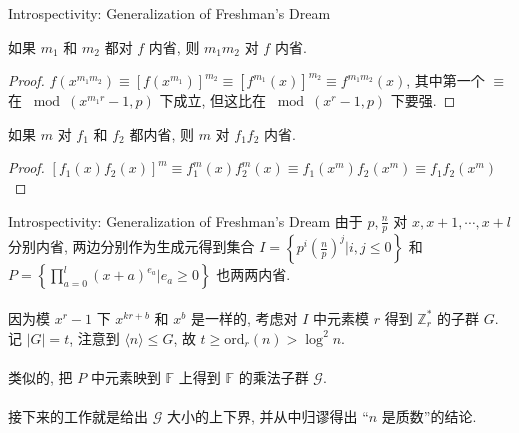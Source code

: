 \documentclass{beamer}
\def\le{\leqslant}
\def\ge{\geqslant}
\def\ord{\textrm{ord}}
\begin{document}
\begin{frame}{Introspectivity: Generalization of Freshman's Dream}
	
	\begin{lemma}[数乘封闭性]
		如果 $m_1$ 和 $m_2$ 都对 $f$ 内省, 则 $m_1m_2$ 对 $f$ 内省.
	\end{lemma}
	\begin{proof}
		$f(x^{m_1m_2}) \equiv [f(x^{m_1})]^{m_2} \equiv [f^{m_1}(x)]^{m_2} \equiv f^{m_1m_2}(x)$, 其中第一个 $\equiv$ 在 $\bmod (x^{m_1r} - 1, p)$ 下成立, 但这比在 $\bmod (x^{r} - 1, p)$ 下要强.
	\end{proof}
	\begin{lemma}[多项式乘封闭性]
		如果 $m$ 对 $f_1$ 和 $f_2$ 都内省, 则 $m$ 对 $f_1f_2$ 内省.
	\end{lemma}
	\begin{proof}
		$[f_1(x)f_2(x)]^m \equiv f_1^m(x)f_2^m(x) \equiv f_1(x^m)f_2(x^m) \equiv f_1f_2(x^m)$
	\end{proof}
\end{frame}
\begin{frame}{Introspectivity: Generalization of Freshman's Dream}
	由于 $p, \frac np$ 对 $x, x + 1, \cdots, x + l$ 分别内省, 两边分别作为生成元得到集合 $I = \left\{p^i \left(\frac np\right)^j \bigg| i, j \le 0\right\}$ 和 $P = \left\{\prod\limits_{a=0}^{l}(x + a)^{e_a} \bigg| e_a \ge 0\right\}$ 也两两内省. \\~\\

	因为模 $x^r - 1$ 下 $x^{kr + b}$ 和 $x^b$ 是一样的, 考虑对 $I$ 中元素模 $r$ 得到 $\mathbb Z_r^*$ 的子群 $G$. 记 $|G| = t$, 注意到 $\langle n \rangle \le G$, 故 $t \ge \ord_r(n) > \log^2n$.\\~\\

	类似的, 把 $P$ 中元素映到 $\mathbb F$ 上得到 $\mathbb F$ 的乘法子群 $\mathcal G$. \\~\\

	接下来的工作就是给出 $\mathcal G$ 大小的上下界, 并从中归谬得出 “$n$ 是质数”的结论.
\end{frame}
\end{document}
